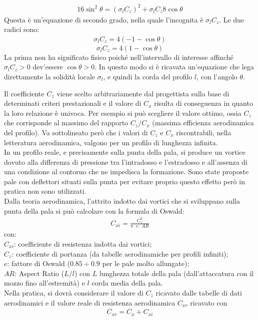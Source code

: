 \begin{align*}
16 \sin^2 \theta = \left( \sigma_l C_z \right)^2 + \sigma_l C_z 8 \cos \theta
\end{align*}
Questa è un'equazione di secondo grado, nella quale l'incognita è $\sigma_l C_z$. Le due radici sono:
\begin{align*}
\sigma_l C_z = 4 \left(-1 -\cos \theta \right)
\end{align*}
\begin{equation}\label{eq:sigmazc}
\boxed{\sigma_l C_z = 4 \left(1- \cos \theta \right)}
\end{equation}
La prima non ha significato fisico poiché nell'intervallo di interesse affinché $\sigma_l C_z > 0$ dev'essere $\cos \theta > 0 $. In questo modo si è ricavata un'equazione che lega direttamente la solidità locale $\sigma_l$, e quindi la corda del profilo $l$, con l'angolo $\theta$.

Il coefficiente $C_z$ viene scelto arbitrariamente dal progettista sulla base di determinati criteri prestazionali e il valore di $C_x$ risulta di conseguenza in quanto la loro relazione è univoca. Per esempio si può scegliere il valore ottimo, ossia $C_z$ che corrisponde al massimo del rapporto $C_z/C_x$ (massima efficienza aerodinamica del profilo). Va sottolineato però che i valori di $C_z$ e $C_x$ riscontrabili, nella letteratura aerodinamica, valgono per un profilo di lunghezza infinita.\\
In un profilo reale, e precisamente sulla punta della pala, si produce un vortice dovuto alla differenza di pressione tra l'intradosso e l'estradosso e all'assenza di una condizione al contorno che ne impedisca la formazione. Sono state proposte pale con deflettori situati sulla punta per evitare proprio questo effetto però in pratica non sono utilizzati.\\
Dalla teoria aerodinamica, l'attrito indotto dai vortici che si sviluppano sulla punta della pala si può calcolare con la formula di Oswald:
\begin{align*}
C_{xi} = \frac{C_z^2}{\pi \cdot e \cdot AR}
\end{align*}
con:\\[1mm]
$C_{xi}$: coefficiente di resistenza indotta dai vortici;\\
$C_z$: coefficiente di portanza (da tabelle aerodinamiche per profili infiniti);\\
$e$: fattore di Oswald ($0.85 \div 0.9$ per le pale molto allungate);\\
$AR$: Aspect Ratio ($L/l$) con $L$ lunghezza totale della pala (dall'attaccatura con il mozzo fino all'estremità) e $l$ corda media della pala.\\[2mm]
Nella pratica, si dovrà considerare il valore di $C_z$ ricavato dalle tabelle di dati aerodinamici e il valore reale di resistenza aerodinamica $C_{xr}$ ricavato con
\begin{align*}
C_{xr} = C_x + C_{xi}
\end{align*}

